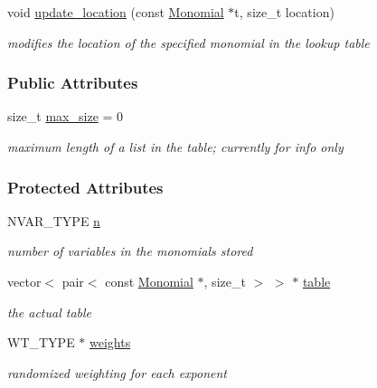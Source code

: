 \begin{DoxyCompactItemize}
void \hyperlink{group___g_b_computation_a0f1a52f055247e86e6b65446c65a87b5}{update\+\_\+location} (const \hyperlink{group__polygroup_class_monomial}{Monomial} $\ast$t, size\+\_\+t location)
\begin{DoxyCompactList}\small\item\em modifies the location of the specified monomial in the lookup table \end{DoxyCompactList}\end{DoxyCompactItemize}
\subsubsection*{Public Attributes}
\begin{DoxyCompactItemize}
\item 
\mbox{\label{group___g_b_computation_aa05b408b16576e49e607249487540930}} 
size\+\_\+t \hyperlink{group___g_b_computation_aa05b408b16576e49e607249487540930}{max\+\_\+size} = 0
\begin{DoxyCompactList}\small\item\em maximum length of a list in the table; currently for info only \end{DoxyCompactList}\end{DoxyCompactItemize}
\subsubsection*{Protected Attributes}
\begin{DoxyCompactItemize}
\item 
\mbox{\label{group___g_b_computation_ab0d30e19b178ed579bd97fc98c4e3de5}} 
N\+V\+A\+R\+\_\+\+T\+Y\+PE \hyperlink{group___g_b_computation_ab0d30e19b178ed579bd97fc98c4e3de5}{n}
\begin{DoxyCompactList}\small\item\em number of variables in the monomials stored \end{DoxyCompactList}\item 
\mbox{\label{group___g_b_computation_a88d54fcb4267c7c727d580b0ed90ff0a}} 
vector$<$ pair$<$ const \hyperlink{group__polygroup_class_monomial}{Monomial} $\ast$, size\+\_\+t $>$ $>$ $\ast$ \hyperlink{group___g_b_computation_a88d54fcb4267c7c727d580b0ed90ff0a}{table}
\begin{DoxyCompactList}\small\item\em the actual table \end{DoxyCompactList}\item 
\mbox{\label{group___g_b_computation_a894a6279c130dd1cdfea12845448e331}} 
W\+T\+\_\+\+T\+Y\+PE $\ast$ \hyperlink{group___g_b_computation_a894a6279c130dd1cdfea12845448e331}{weights}
\begin{DoxyCompactList}\small\item\em randomized weighting for each exponent \end{DoxyCompactList}\end{DoxyCompactItemize}
